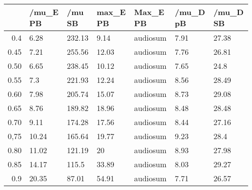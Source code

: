 \begin{table}[ht]
\centering
\begin{tabular}{rllllll}
  \hline
 & /mu\_E PB & /mu SB & max\_E PB & Max\_E PB & /mu\_D pB & /mu\_D SB \\ 
  \hline
0.4 & 6.28 & 232.13 & 9.14 & audiosum & 7.91 & 27.38 \\ 
  0.45 & 7.21 & 255.56 & 12.03 & audiosum & 7.76 & 26.81 \\ 
  0.50 & 6.65 & 238.45 & 10.12 & audiosum & 7.65 & 24.8 \\ 
  0.55 & 7.3 & 221.93 & 12.24 & audiosum & 8.56 & 28.49 \\ 
  0.60 & 7.98 & 205.74 & 15.07 & audiosum & 8.73 & 29.08 \\ 
  0.65 & 8.76 & 189.82 & 18.96 & audiosum & 8.48 & 28.48 \\ 
  0.70 & 9.11 & 174.28 & 17.56 & audiosum & 8.44 & 27.16 \\ 
  0,75 & 10.24 & 165.64 & 19.77 & audiosum & 9.23 & 28.4 \\ 
  0.80 & 11.02 & 121.19 & 20 & audiosum & 8.93 & 27.98 \\ 
  0.85 & 14.17 & 115.5 & 33.89 & audiosum & 8.03 & 29.27 \\ 
  0.9 & 20.35 & 87.01 & 54.91 & audiosum & 7.71 & 26.57 \\ 
   \hline
\end{tabular}
\end{table}
